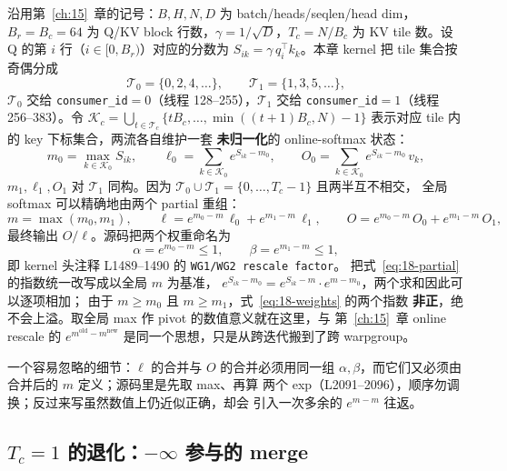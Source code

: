 沿用第~\ref{ch:15}~章的记号：$B, H, N, D$ 为 batch/heads/seqlen/head dim，
$B_r = B_c = 64$ 为 Q/KV block 行数，$\gamma = 1/\sqrt{D}$，$T_c = N/B_c$ 为
KV tile 数。设 Q 的第 $i$ 行（$i \in [0, B_r)$）对应的分数为
$S_{ik} = \gamma\, q_i^\top k_k$。本章 kernel 把 tile 集合按奇偶分成
\begin{equation}
  \mathcal{T}_0 = \{0, 2, 4, \dots\}, \qquad
  \mathcal{T}_1 = \{1, 3, 5, \dots\} ,
  \label{eq:18-split}
\end{equation}
$\mathcal{T}_0$ 交给 \texttt{consumer\_id}$=0$（线程 128--255），$\mathcal{T}_1$
交给 \texttt{consumer\_id}$=1$（线程 256--383）。令 $\mathcal K_c=\bigcup_{t\in\mathcal T_c}\{tB_c,\dots,\min((t+1)B_c,N)-1\}$
表示对应 tile 内的 key 下标集合，两流各自维护一套
\textbf{未归一化}的 online-softmax 状态：
\begin{equation}
  m_0 = \max_{k \in \mathcal K_0} S_{ik}, \qquad
  \ell_0 = \sum_{k \in \mathcal K_0} e^{S_{ik} - m_0}, \qquad
  O_0 = \sum_{k \in \mathcal K_0} e^{S_{ik} - m_0}\, v_k ,
  \label{eq:18-partial}
\end{equation}
$m_1, \ell_1, O_1$ 对 $\mathcal{T}_1$ 同构。因为
$\mathcal{T}_0 \cup \mathcal{T}_1 = \{0, \dots, T_c-1\}$ 且两半互不相交，
全局 softmax 可以精确地由两个 partial 重组：
\begin{equation}
  m = \max(m_0, m_1), \qquad
  \ell = e^{m_0 - m}\,\ell_0 + e^{m_1 - m}\,\ell_1, \qquad
  O = e^{m_0 - m}\,O_0 + e^{m_1 - m}\,O_1 ,
  \label{eq:18-merge}
\end{equation}
最终输出 $O/\ell$。源码把两个权重命名为
\begin{equation}
  \alpha = e^{m_0 - m} \le 1, \qquad \beta = e^{m_1 - m} \le 1 ,
  \label{eq:18-weights}
\end{equation}
即 kernel 头注释 L1489--1490 的 \texttt{WG1/WG2 rescale factor}。
把式~\ref{eq:18-partial} 的指数统一改写成以全局 $m$ 为基准，
$e^{S_{ik}-m_0} = e^{S_{ik}-m}\cdot e^{m-m_0}$，两个求和因此可以逐项相加；
由于 $m \ge m_0$ 且 $m \ge m_1$，式~\ref{eq:18-weights} 的两个指数
\textbf{非正}，绝不会上溢。取全局 max 作 pivot 的数值意义就在这里，与
第~\ref{ch:15}~章 online rescale 的 $e^{m^{\mathrm{old}}-m^{\mathrm{new}}}$
是同一个思想，只是从跨迭代搬到了跨 warpgroup。

一个容易忽略的细节：$\ell$ 的合并与 $O$ 的合并必须用同一组
$\alpha, \beta$，而它们又必须由合并后的 $m$ 定义；源码里是先取 max、再算
两个 exp（L2091--2096），顺序勿调换；反过来写虽然数值上仍近似正确，却会
引入一次多余的 $e^{m-m}$ 往返。

\subsection{$T_c = 1$ 的退化：$-\infty$ 参与的 merge}

